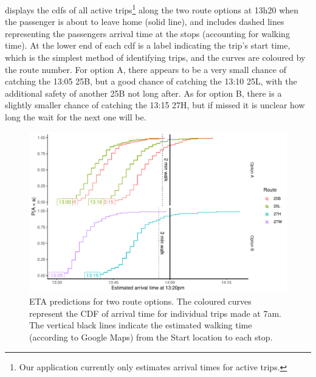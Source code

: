  displays the \glspl{cdf} of all active trips\footnote{Our application currently only estimates arrival times for active trips.} along the two route options at 13h20 when the passenger is about to leave home (solid line), and includes dashed lines representing the passengers arrival time at the stops (accounting for walking time). At the lower end of each \gls{cdf} is a label indicating the trip's start time, which is the simplest method of identifying trips, and the curves are coloured by the route number. For option A, there appears to be a very small chance of catching the 13:05 25B, but a good chance of catching the 13:10 25L, with the additional safety of another 25B not long after. As for option B, there is a slightly smaller chance of catching the 13:15 27H, but if missed it is unclear how long the wait for the next one will be.


\begin{knitrout}\small
{}\color{fgcolor}\begin{figure}

{\centering \includegraphics[width=\textwidth]{figure/eta_journey_arriveby-1} 

}

\caption[ETA predictions for two route options]{ETA predictions for two route options. The coloured curves represent the CDF of arrival time for individual trips made at 7am. The vertical black lines indicate the estimated walking time (according to Google Maps) from the Start location to each stop.}\label{fig:eta_journey_arriveby}
\end{figure}


\end{knitrout}

